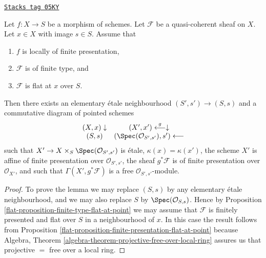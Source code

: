 \begin{lemma}
\label{flat-lemma-finite-type-flat-at-point-free}
\href{https://stacks.math.columbia.edu/tag/05KY}{\texttt{Stacks tag 05KY}}

Let $f : X \to S$ be a morphism of schemes.
Let $\mathcal{F}$ be a quasi-coherent sheaf on $X$.
Let $x \in X$ with image $s \in S$.
Assume that
\begin{enumerate}
\item $f$ is locally of finite presentation,
\item $\mathcal{F}$ is of finite type, and
\item $\mathcal{F}$ is flat at $x$ over $S$.
\end{enumerate}
Then there exists an elementary \'etale neighbourhood $(S', s') \to (S, s)$
and a commutative diagram of pointed schemes
$$
\begin{array}{cc}(X, x) \downarrow & (X', x') \overset{g}{\longleftarrow}\downarrow \\ (S, s) & (\Spec(\mathcal{O}_{S', s'}), s') \longleftarrow\end{array}
$$
such that $X' \to X \times_S \Spec(\mathcal{O}_{S', s'})$
is \'etale, $\kappa(x) = \kappa(x')$, the scheme $X'$ is
affine of finite presentation over $\mathcal{O}_{S', s'}$,
the sheaf $g^*\mathcal{F}$ is of finite presentation over $\mathcal{O}_{X'}$,
and such that $\Gamma(X', g^*\mathcal{F})$ is a free
$\mathcal{O}_{S', s'}$-module.
\end{lemma}

\begin{proof}

To prove the lemma we may replace $(S, s)$ by any elementary \'etale
neighbourhood, and we may also replace $S$ by
$\Spec(\mathcal{O}_{S, s})$. Hence by
Proposition \ref{flat-proposition-finite-type-flat-at-point}
we may assume that $\mathcal{F}$ is finitely presented and flat over
$S$ in a neighbourhood of $x$. In this case the result follows from
Proposition \ref{flat-proposition-finite-presentation-flat-at-point}
because
Algebra, Theorem \ref{algebra-theorem-projective-free-over-local-ring}
assures us that projective $=$ free over a local ring.
\end{proof}

